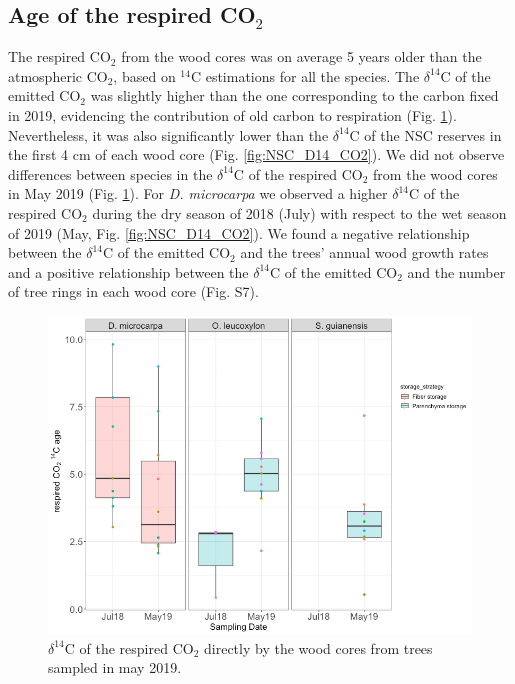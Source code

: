 \documentclass{article}
\begin{document}
\subsection{Age of the respired CO$_2$}

The respired CO$_{2}$ from the wood cores was on average 5 years older than the atmospheric CO$_{2}$, based on $^{14}$C estimations for all the species. The $\delta^{14}$C of the emitted CO$_{2}$ was slightly higher than the one corresponding to the carbon fixed in 2019, evidencing the contribution of old carbon to respiration (Fig. \ref{fig:D14_CO2}). Nevertheless, it was also significantly lower than the $\delta^{14}$C of the NSC reserves in the first 4 cm of each wood core (Fig. \ref{fig:NSC_D14_CO2}). We did not observe differences between species in the $\delta^{14}$C of the respired CO$_{2}$ from the wood cores in May 2019 (Fig. \ref{fig:D14_CO2}). For \textit{D. microcarpa} we observed a higher $\delta^{14}$C of the respired CO$_{2}$ during the dry season of 2018 (July) with respect to the wet season of 2019 (May, Fig. \ref{fig:NSC_D14_CO2}). We found a negative relationship between the $\delta^{14}$C of the emitted CO$_{2}$ and the trees' annual wood growth rates and a positive relationship between the $\delta^{14}$C of the emitted CO$_{2}$ and the number of tree rings in each wood core (Fig. S7).


 \begin{figure}[ht] %
   \centering
   \includegraphics[width=5.5in]{resp_CO2_ges.png} 
   \caption{ $\delta^{14}$C of the respired CO$_2$ directly by the wood cores from trees sampled in may 2019.}
   \label{fig:D14_CO2}
\end{figure}
\end{document}

